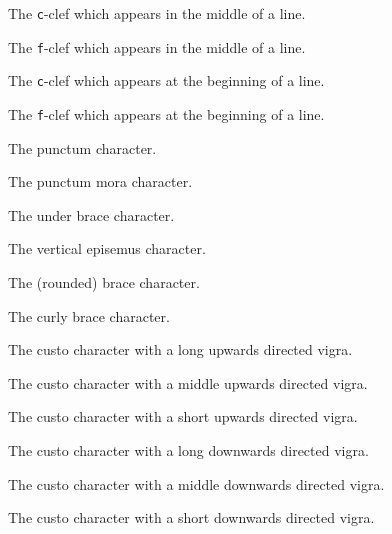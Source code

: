 The \texttt{c}-clef which appears in the middle of a line.

The \texttt{f}-clef which appears in the middle of a line.

The \texttt{c}-clef which appears at the beginning of a line.

The \texttt{f}-clef which appears at the beginning of a line.

The punctum character.

The punctum mora character.

The under brace character.

The vertical episemus character.

The (rounded) brace character.

The curly brace character.

The custo character with a long upwards directed vigra.

The custo character with a middle upwards directed vigra.

The custo character with a short upwards directed vigra.

The custo character with a long downwards directed vigra.

The custo character with a middle downwards directed vigra.

The custo character with a short downwards directed vigra.

